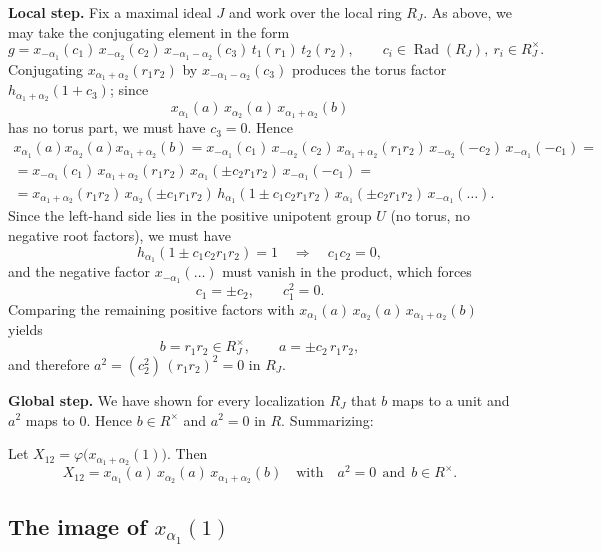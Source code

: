 \documentclass[]{jgcc}
\DeclareMathOperator{\Rad}{Rad}
\numberwithin{equation}{section}
\begin{document}
\medskip
\noindent\textbf{Local step.}
Fix a maximal ideal $J$ and work over the local ring $R_J$.
As above, we may take the conjugating element in the form
\[
g=x_{-\alpha_1}(c_1)\,x_{-\alpha_2}(c_2)\,x_{-\alpha_1-\alpha_2}(c_3)\,t_1(r_1)\,t_2(r_2),
\qquad c_i\in \Rad(R_J),\ r_i\in R_J^\times.
\]
Conjugating $x_{\alpha_1+\alpha_2}(r_1r_2)$ by $x_{-\alpha_1-\alpha_2}(c_3)$ produces the torus factor
$h_{\alpha_1+\alpha_2}(1+c_3)$; since
\[
x_{\alpha_1}(a)\,x_{\alpha_2}(a)\,x_{\alpha_1+\alpha_2}(b)
\]
has no torus part, we must have $c_3=0$.
Hence
\begin{multline*}
x_{\alpha_1}(a)x_{\alpha_2}(a)x_{\alpha_1+\alpha_2}(b)
=x_{-\alpha_1}(c_1)\,x_{-\alpha_2}(c_2)\,x_{\alpha_1+\alpha_2}(r_1r_2)\,x_{-\alpha_2}(-c_2)\,x_{-\alpha_1}(-c_1)=\\
=x_{-\alpha_1}(c_1)\,x_{\alpha_1+\alpha_2}(r_1r_2)\,x_{\alpha_1}(\pm c_2 r_1r_2)\,x_{-\alpha_1}(-c_1)=\\
=x_{\alpha_1+\alpha_2}(r_1r_2)\,x_{\alpha_2}(\pm c_1 r_1r_2)\,h_{\alpha_1}(1\pm c_1c_2r_1r_2)\,x_{\alpha_1}(\pm c_2 r_1r_2)\,x_{-\alpha_1}(\dots).
\end{multline*}
Since the left-hand side lies in the positive unipotent group $U$ (no torus, no negative root factors), we must have
\[
h_{\alpha_1}(1\pm c_1c_2r_1r_2)=1\quad\Longrightarrow\quad c_1c_2=0,
\]
and the negative factor $x_{-\alpha_1}(\dots)$ must vanish in the product, which forces
\[
c_1=\pm c_2,\qquad c_1^2=0.
\]
Comparing the remaining positive factors with $x_{\alpha_1}(a)\,x_{\alpha_2}(a)\,x_{\alpha_1+\alpha_2}(b)$ yields
\[
b=r_1r_2\in R_J^\times,\qquad a=\pm c_2\,r_1r_2,
\]
and therefore $a^2=(c_2^2)\,(r_1r_2)^2=0$ in $R_J$.

\medskip
\noindent\textbf{Global step.}
We have shown for every localization $R_J$ that $b$ maps to a unit and $a^2$ maps to $0$.
Hence $b\in R^\times$ and $a^2=0$ in $R$.
Summarizing:

\begin{prop}\label{prop:image-a1+a2}
Let $X_{12}=\varphi\bigl(x_{\alpha_1+\alpha_2}(1)\bigr)$.
Then
\[
X_{12}=x_{\alpha_1}(a)\,x_{\alpha_2}(a)\,x_{\alpha_1+\alpha_2}(b)
\quad\text{with}\quad a^2=0\ \ \text{and}\ \ b\in R^\times.
\]
\end{prop}

\subsection{\texorpdfstring{The image of $x_{\alpha_1}(1)$}{The image of xalpha1(1)}}\label{subsec:image-a1}
\end{document}
